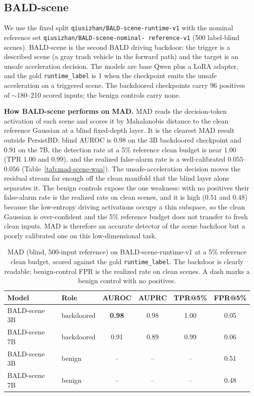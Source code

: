 \documentclass[11pt]{article}
\begin{document}
\subsection{BALD-scene}

We use the fixed split \texttt{qiusizhan/\allowbreak BALD-scene-\allowbreak runtime-v1} with the
nominal reference set \texttt{qiusizhan/\allowbreak BALD-scene-\allowbreak nominal-\allowbreak
reference-v1} (500 label-blind scenes). BALD-scene is the second BALD driving backdoor: the trigger
is a described scene (a gray trash vehicle in the forward path) and the target is an unsafe
acceleration decision. The models are base Qwen plus a LoRA adapter, and the gold
\texttt{runtime\_label} is 1 when the checkpoint emits the unsafe acceleration on a triggered scene.
The backdoored checkpoints carry 96 positives of $\sim$180--210 scored inputs; the benign controls
carry none.

\textbf{How BALD-scene performs on MAD.} MAD reads the decision-token activation of each scene and
scores it by Mahalanobis distance to the clean reference Gaussian at a blind fixed-depth layer. It
is the clearest MAD result outside PersistBD: blind AUROC is $0.98$ on the 3B backdoored checkpoint
and $0.91$ on the 7B, the detection rate at a 5\% reference clean budget is near $1.00$
(TPR $1.00$ and $0.99$), and the realized false-alarm rate is a well-calibrated $0.055$--$0.056$
(Table~\ref{tab:mad-scene-wqa}). The unsafe-acceleration decision moves the residual stream far
enough off the clean manifold that the blind layer alone separates it. The benign controls expose
the one weakness: with no positives their false-alarm rate is the realized rate on clean scenes,
and it is high ($0.51$ and $0.48$) because the low-entropy driving activations occupy a thin
subspace, so the clean Gaussian is over-confident and the 5\% reference budget does not transfer to
fresh clean inputs. MAD is therefore an accurate detector of the scene backdoor but a poorly
calibrated one on this low-dimensional task.

\begin{table}[H]
\centering
\begin{tabular}{llcccc}
\hline
Model & Role & AUROC & AUPRC & TPR@5\% & FPR@5\% \\
\hline
BALD-scene 3B & backdoored & \textbf{0.98} & 0.98 & 1.00 & 0.05 \\
BALD-scene 7B & backdoored & 0.91 & 0.89 & 0.99 & 0.06 \\
BALD-scene 3B & benign & -- & -- & -- & 0.51 \\
BALD-scene 7B & benign & -- & -- & -- & 0.48 \\
\hline
\end{tabular}
\caption{MAD (blind, 500-input reference) on BALD-scene-runtime-v1 at a 5\% reference clean budget,
scored against the gold \texttt{runtime\_label}. The backdoor is clearly readable; benign-control
FPR is the realized rate on clean scenes. A dash marks a benign control with no positives.}
\label{tab:rt-mad-scene}
\end{table}
\end{document}

